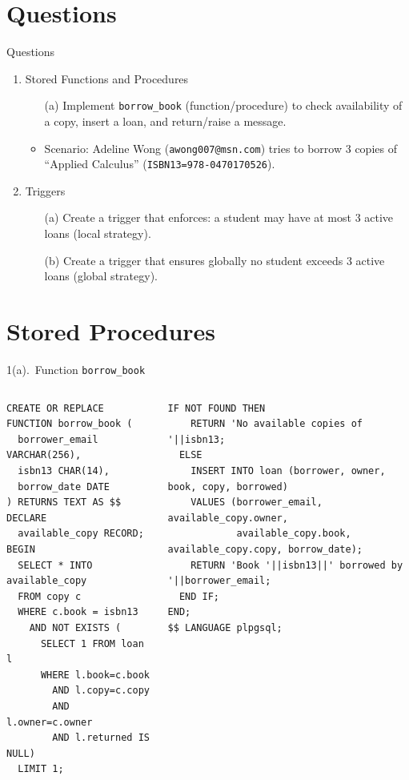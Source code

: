 \documentclass{beamer}
\begin{document}
\section{Questions}
\begin{frame}{Questions}
\footnotesize
\begin{enumerate}
  \item Stored Functions and Procedures
  \begin{itemize}
    \item[(a)] Implement \texttt{borrow\_book} (function/procedure) to check availability of a copy, insert a loan, and return/raise a message.
    \item Scenario: Adeline Wong (\texttt{awong007@msn.com}) tries to borrow 3 copies of “Applied Calculus” (\texttt{ISBN13=978-0470170526}).
  \end{itemize}
  \item Triggers
  \begin{itemize}
    \item[(a)] Create a trigger that enforces: a student may have at most 3 active loans (local strategy).
    \item[(b)] Create a trigger that ensures globally no student exceeds 3 active loans (global strategy).
  \end{itemize}
\end{enumerate}
\end{frame}

\section{Stored Procedures}
\begin{frame}[fragile]{1(a).\ Function \texttt{borrow\_book}}
\vspace{-0.3em}
\begin{columns}[t,onlytextwidth]
\begin{lstlisting}[numbers=none]
CREATE OR REPLACE FUNCTION borrow_book (
  borrower_email VARCHAR(256),
  isbn13 CHAR(14),
  borrow_date DATE
) RETURNS TEXT AS $$
DECLARE
  available_copy RECORD;
BEGIN
  SELECT * INTO available_copy
  FROM copy c
  WHERE c.book = isbn13
    AND NOT EXISTS (
      SELECT 1 FROM loan l
      WHERE l.book=c.book
        AND l.copy=c.copy
        AND l.owner=c.owner
        AND l.returned IS NULL)
  LIMIT 1;
\end{lstlisting}

\begin{lstlisting}[numbers=none]
  IF NOT FOUND THEN
    RETURN 'No available copies of '||isbn13;
  ELSE
    INSERT INTO loan (borrower, owner, book, copy, borrowed)
    VALUES (borrower_email, available_copy.owner,
            available_copy.book, available_copy.copy, borrow_date);
    RETURN 'Book '||isbn13||' borrowed by '||borrower_email;
  END IF;
END;
$$ LANGUAGE plpgsql;
\end{lstlisting}
\end{columns}
\end{frame}
\end{document}
